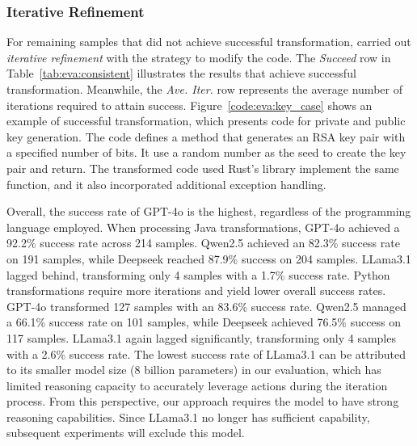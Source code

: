 

\subsubsection{Iterative Refinement}
For remaining samples that did not achieve successful transformation, \system carried out \emph{iterative refinement} with the  strategy to modify the code.
The \textit{Succeed} row in Table~\ref{tab:eva:consistent} illustrates the results that achieve successful transformation.
Meanwhile, the \textit{Ave. Iter.} row represents the average number of iterations required to attain success.
Figure~\ref{code:eva:key_case} shows an example of successful transformation, which presents code for private and public key generation.
The code defines a method that generates an RSA key pair with a specified number of bits.
It use a random number as the seed to create the key pair and return.
The transformed code used Rust's library implement the same function, and it also incorporated additional exception handling.



Overall, the success rate of GPT-4o is the highest, regardless of the programming language employed.
When processing Java transformations, GPT-4o achieved a 92.2\% success rate across 214 samples.
Qwen2.5 achieved an 82.3\% success rate on 191 samples, while Deepseek reached 87.9\% success on 204 samples.
LLama3.1 lagged behind, transforming only 4 samples with a 1.7\% success rate.
Python transformations require more iterations and yield lower overall success rates.
GPT-4o transformed 127 samples with an 83.6\% success rate.
Qwen2.5 managed a 66.1\% success rate on 101 samples, while Deepseek achieved 76.5\% success on 117 samples.
LLama3.1 again lagged significantly, transforming only 4 samples with a 2.6\% success rate.
The lowest success rate of LLama3.1 can be attributed to its smaller model size (8 billion parameters) in our evaluation, which has limited reasoning capacity to accurately leverage actions during the iteration process.
From this perspective, our approach requires the model to have strong reasoning capabilities.
Since LLama3.1 no longer has sufficient capability, subsequent experiments will exclude this model.




